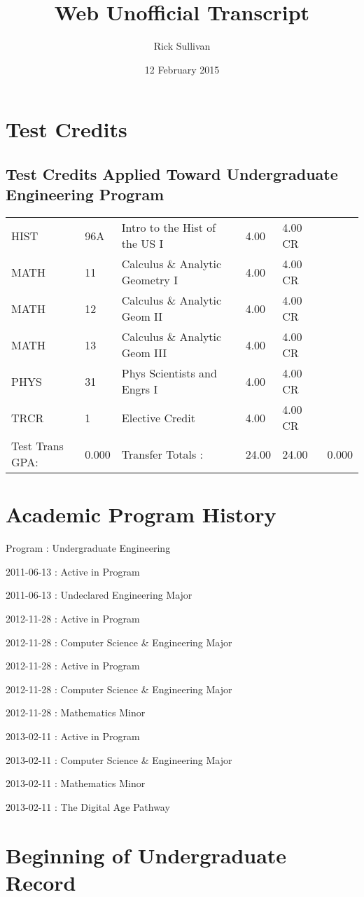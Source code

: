 \documentclass{article}\usepackage[T1]{fontenc}
\title{Web Unofficial Transcript}
\author{Rick Sullivan}
\date{12 February 2015}
\begin{document}
\maketitle

\section{Test Credits}
\subsection{Test Credits Applied Toward Undergraduate Engineering Program}
\begin{tabu}{ l  l  l  l  l  l }
HIST&96A&Intro to the Hist of the US I&4.00&4.00 CR&\\
MATH&11&Calculus \& Analytic Geometry I&4.00&4.00 CR&\\
MATH&12&Calculus \& Analytic Geom II&4.00&4.00 CR&\\
MATH&13&Calculus \& Analytic Geom III&4.00&4.00 CR&\\
PHYS&31&Phys Scientists and Engrs I&4.00&4.00 CR&\\
TRCR&1&Elective Credit&4.00&4.00 CR&\\
Test Trans GPA:&0.000&Transfer Totals :&24.00&24.00&0.000\\\end{tabu}
\section{Academic Program History}
Program	:	Undergraduate Engineering \

2011-06-13	:	Active in Program \

2011-06-13 : Undeclared Engineering Major \

2012-11-28	:	Active in Program \

2012-11-28 : Computer Science \& Engineering Major \

2012-11-28	:	Active in Program \

2012-11-28 : Computer Science \& Engineering Major \

2012-11-28 : Mathematics Minor \

2013-02-11	:	Active in Program \

2013-02-11 : Computer Science \& Engineering Major \

2013-02-11 : Mathematics Minor \

2013-02-11 : The Digital Age Pathway \

\section{Beginning of Undergraduate Record}
\end{document}
